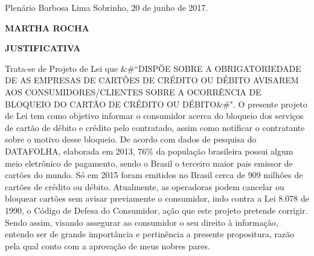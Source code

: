 \documentclass[10pt]{article}
\begin{document}
\begin{center}
  Plenário Barbosa Lima Sobrinho, 20 de junho de 2017.

   \bigskip

  \textbf{ MARTHA ROCHA}

  \bigskip

  \textbf{JUSTIFICATIVA}
  \bigskip

\end{center}

  	Trata-se de Projeto de Lei que &#``DISPÕE SOBRE A OBRIGATORIEDADE DE AS EMPRESAS DE CARTÕES DE CRÉDITO OU DÉBITO AVISAREM AOS CONSUMIDORES/CLIENTES SOBRE A OCORRÊNCIA DE BLOQUEIO DO CARTÃO DE CRÉDITO OU DÉBITO&#".
	O presente projeto de Lei tem como objetivo informar o consumidor acerca do bloqueio dos serviços de cartão de débito e crédito pelo contratado, assim como notificar o contratante sobre o motivo desse bloqueio.
	De acordo com dados de pesquisa do DATAFOLHA, elaborada em 2013, 76\% da população brasileira possui algum meio eletrônico de pagamento, sendo o Brasil o terceiro maior pais emissor de cartões do mundo. Só em 2015 foram emitidos no Brasil cerca de 909 milhões de cartões de crédito ou débito.
	Atualmente, as operadoras podem cancelar ou bloquear cartões sem avisar previamente o consumidor, indo contra a Lei 8.078 de 1990, o Código de Defesa do Consumidor, ação que este projeto pretende corrigir.
	Sendo assim, visando assegurar ao consumidor o seu direito à informação, entendo ser de grande importância e pertinência a presente propositura, razão pela qual conto com a aprovação de meus nobres pares.



\iffalse
\begin{center}
  \textbf{REFERÊNCIAS}
\end{center}


\fi
\end{document}
